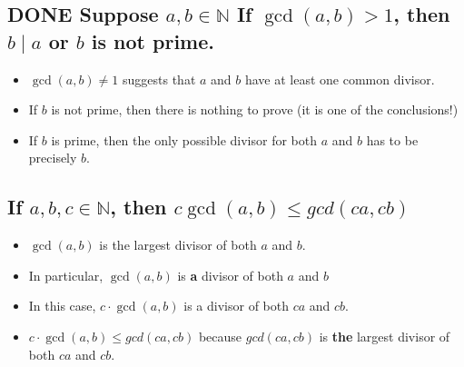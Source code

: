 \documentclass[11pt, oneside]{amsart}
\begin{document}
\subsection{{\bfseries\sffamily DONE} Suppose \(a, b \in \mathbb{N}\) If \(\gcd(a,b)>1\), then \(b \mid a\) or \(b\) is not prime.}
\label{sec:org4c526c3}
\begin{itemize}
\item \(\gcd(a,b) \neq 1\) suggests that \(a\) and \(b\) have at least one common divisor.
\item If \(b\) is not prime, then there is nothing to prove (it is one of the conclusions!)
\item If \(b\) is prime, then the only possible divisor for both \(a\) and \(b\) has to be precisely \(b\).
\end{itemize}

\subsection{If \(a, b, c \in \mathbb{N}\), then \(c \gcd(a,b) \leq gcd(ca, cb)\)}
\label{sec:org4f9dafe}
\begin{itemize}
\item \(\gcd(a,b)\) is the largest divisor of both \(a\) and \(b\).
\item In particular, \(\gcd(a,b)\) is \textbf{a} divisor of both \(a\) and \(b\)
\item In this case, \(c \cdot \gcd(a,b)\) is a divisor of both \(ca\) and \(cb\).
\item \(c \cdot \gcd(a,b) \leq gcd(ca, cb)\) because \(gcd(ca, cb)\) is \textbf{the} largest divisor of both \(ca\) and \(cb\).
\end{itemize}
\end{document}
